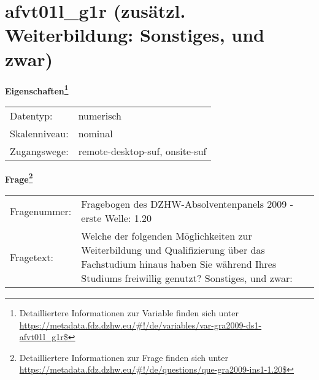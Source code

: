 
    \setcounter{footnote}{0}

    \vspace*{-1.8cm}
	\section{afvt01l\_g1r (zusätzl. Weiterbildung: Sonstiges, und zwar)}
	\label{section:afvt01l_g1r}



    \vspace*{0.5cm}
    \noindent\textbf{Eigenschaften\footnote{Detailliertere Informationen zur Variable finden sich unter
		\url{https://metadata.fdz.dzhw.eu/\#!/de/variables/var-gra2009-ds1-afvt01l_g1r$}}}\\
	\begin{tabularx}{\hsize}{@{}lX}
	Datentyp: & numerisch \\
	Skalenniveau: & nominal \\
	Zugangswege: &
	  remote-desktop-suf, 
	  onsite-suf
 \\
    \end{tabularx}



				\vspace*{0.5cm}
                \noindent\textbf{Frage\footnote{Detailliertere Informationen zur Frage finden sich unter
		              \url{https://metadata.fdz.dzhw.eu/\#!/de/questions/que-gra2009-ins1-1.20$}}}\\
				\begin{tabularx}{\hsize}{@{}lX}
					Fragenummer: &
					  Fragebogen des DZHW-Absolventenpanels 2009 - erste Welle:
					  1.20
 \\
					Fragetext: & Welche der folgenden Möglichkeiten zur Weiterbildung und Qualifizierung über das Fachstudium hinaus haben Sie während Ihres Studiums freiwillig genutzt? Sonstiges, und zwar: \\
				\end{tabularx}





